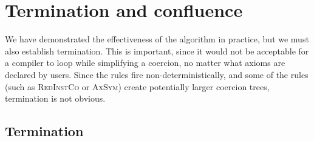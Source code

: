 \documentclass[a4paper,UKenglish]{lipics}
\def\rulename#1{\textsc{#1}}
\def\rulename#1{\textsc{#1}}
\newcommand{\ol}[1]{\overline{#1}}
\begin{document}
\section{Termination and confluence}\label{ssect:termination}
\newcommand{\ps}{\ol{p}}

We have demonstrated the effectiveness of the algorithm in practice, but we must also 
establish termination. This is important, since it would not be acceptable
for a compiler to loop while simplifying a coercion, no matter what axioms are declared by users.
Since the rules fire non-deterministically, and some of the rules (such as \rulename{RedInstCo} or \rulename{AxSym})
create potentially larger coercion trees, termination is not obvious. 

\subsection{Termination}
\end{document}
